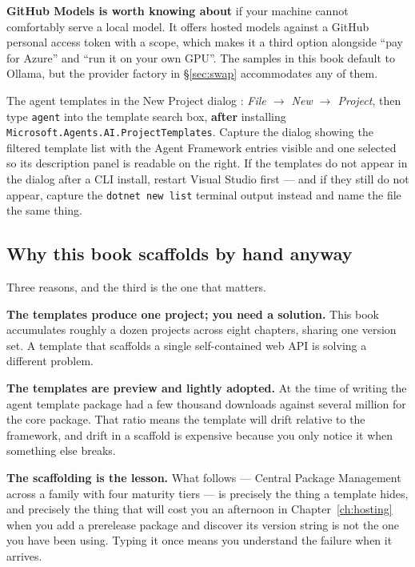\begin{note}
\textbf{GitHub Models is worth knowing about} if your machine cannot comfortably
serve a local model. It offers hosted models against a GitHub personal access
token with a  scope, which makes it a third option alongside ``pay
for Azure'' and ``run it on your own GPU''. The samples in this book default to
Ollama, but the provider factory in \S\ref{sec:swap} accommodates any of them.
\end{note}

%
{The agent templates in the New Project dialog}%
{\vsver{}: \emph{File $\rightarrow$ New $\rightarrow$ Project}, then type
\texttt{agent} into the template search box, \textbf{after} installing
\texttt{Microsoft.Agents.AI.ProjectTemplates}. Capture the dialog showing the
filtered template list with the Agent Framework entries visible and one selected
so its description panel is readable on the right. If the templates do not appear
in the dialog after a CLI install, restart Visual Studio first --- and if they
still do not appear, capture the \texttt{dotnet new list} terminal output instead
and name the file the same thing.}

\subsection{Why this book scaffolds by hand anyway}

Three reasons, and the third is the one that matters.

\textbf{The templates produce one project; you need a solution.} This book
accumulates roughly a dozen projects across eight chapters, sharing one version
set. A template that scaffolds a single self-contained web API is solving a
different problem.

\textbf{The templates are preview and lightly adopted.} At the time of writing
the agent template package had a few thousand downloads against several million
for the core package. That ratio means the template will drift relative to the
framework, and drift in a scaffold is expensive because you only notice it when
something else breaks.

\textbf{The scaffolding is the lesson.} What follows --- Central Package
Management across a family with four maturity tiers --- is precisely the thing a
template hides, and precisely the thing that will cost you an afternoon in
Chapter~\ref{ch:hosting} when you add a prerelease package and discover its
version string is not the one you have been using. Typing it once means you
understand the failure when it arrives.

